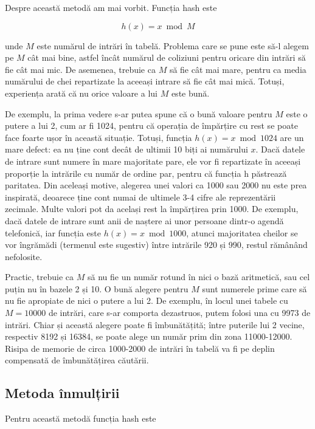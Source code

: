 Despre această metodă am mai vorbit. Funcția hash este

\begin{equation}
  h(x)=x \bmod M
\end{equation}

unde $M$ este numărul de intrări în tabelă. Problema care se pune este să-l
alegem pe $M$ cât mai bine, astfel încât numărul de coliziuni pentru oricare
din intrări să fie cât mai mic. De asemenea, trebuie ca $M$ să fie cât mai
mare, pentru ca media numărului de chei repartizate la aceeași intrare să fie
cât mai mică. Totuși, experiența arată că nu orice valoare a lui $M$ este
bună.

De exemplu, la prima vedere s-ar putea spune că o bună valoare pentru $M$ este
o putere a lui 2, cum ar fi 1024, pentru că operația de împărțire cu rest se
poate face foarte ușor în această situație. Totuși, funcția $h(x)=x \bmod
1024$ are un mare defect: ea nu ține cont decât de ultimii 10 biți ai
numărului $x$. Dacă datele de intrare sunt numere în mare majoritate pare, ele
vor fi repartizate în aceeași proporție la intrările cu număr de ordine par,
pentru că funcția h păstrează paritatea. Din aceleași motive, alegerea unei
valori ca 1000 sau 2000 nu este prea inspirată, deoarece ține cont numai de
ultimele 3-4 cifre ale reprezentării zecimale. Multe valori pot da același
rest la împărțirea prin 1000. De exemplu, dacă datele de intrare sunt anii de
naștere ai unor persoane dintr-o agendă telefonică, iar funcția este $h(x)=x
\bmod 1000$, atunci majoritatea cheilor se vor îngrămădi (termenul este
sugestiv) între intrările 920 și 990, restul rămânând nefolosite.

Practic, trebuie ca $M$ să nu fie un număr rotund în nici o bază aritmetică,
sau cel puțin nu în bazele 2 și 10. O bună alegere pentru $M$ sunt numerele
prime care să nu fie apropiate de nici o putere a lui 2. De exemplu, în locul
unei tabele cu $M=10000$ de intrări, care s-ar comporta dezastruos, putem
folosi una cu 9973 de intrări. Chiar și această alegere poate fi îmbunătățită;
între puterile lui 2 vecine, respectiv 8192 și 16384, se poate alege un număr
prim din zona 11000-12000. Risipa de memorie de circa 1000-2000 de intrări în
tabelă va fi pe deplin compensată de îmbunătățirea căutării.

\subsection{Metoda înmulțirii}

Pentru această metodă funcția hash este

